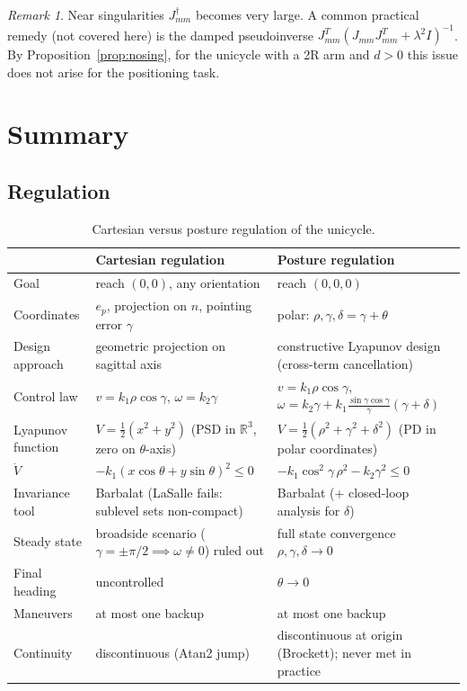 \documentclass[11pt,a4paper]{article}
\def\bm#1{#1}%
\newcommand{\R}{\mathbb{R}}
\newcommand{\Jmm}{\bm{J}_{mm}}
\theoremstyle{definition}
\theoremstyle{plain}
\theoremstyle{remark}
\newtheorem*{remark}{Remark}
\begin{document}
\begin{remark}
Near singularities $\Jmm^\dagger$ becomes very large. A common practical remedy (not covered here) is the damped pseudoinverse $\Jmm^T(\Jmm\Jmm^T+\lambda^2\bm I)^{-1}$. By Proposition~\ref{prop:nosing}, for the unicycle with a 2R arm and $d>0$ this issue does not arise for the positioning task.
\end{remark}

\section{Summary}

\subsection*{Regulation}

\begin{table}[ht]
\centering
\renewcommand{\arraystretch}{1.35}
\begin{tabular}{@{}>{\raggedright\arraybackslash}p{2.6cm}>{\raggedright\arraybackslash}p{6.0cm}>{\raggedright\arraybackslash}p{6.2cm}@{}}
\toprule
 & \textbf{Cartesian regulation} & \textbf{Posture regulation}\\
\midrule
Goal & reach $(0,0)$, any orientation & reach $(0,0,0)$\\
Coordinates & $\bm e_p$, projection on $\bm n$, pointing error $\gamma$ & polar: $\rho,\gamma,\delta=\gamma+\theta$\\
Design approach & geometric projection on sagittal axis & constructive Lyapunov design (cross-term cancellation)\\
Control law & $v=k_1\rho\cos\gamma$, $\omega=k_2\gamma$ & $v=k_1\rho\cos\gamma$, $\omega=k_2\gamma+k_1\frac{\sin\gamma\cos\gamma}{\gamma}(\gamma+\delta)$\\
Lyapunov function & $V=\frac12(x^2+y^2)$ (PSD in $\R^3$, zero on $\theta$-axis) & $V=\frac12(\rho^2+\gamma^2+\delta^2)$ (PD in polar coordinates)\\
$\dot V$ & $-k_1(x\cos\theta+y\sin\theta)^2\le0$ & $-k_1\cos^2\!\gamma\,\rho^2-k_2\gamma^2\le0$\\
Invariance tool & Barbalat (LaSalle fails: sublevel sets non-compact) & Barbalat (+ closed-loop analysis for $\delta$)\\
Steady state & broadside scenario ($\gamma=\pm\pi/2\implies\omega\ne0$) ruled out & full state convergence $\rho,\gamma,\delta\to0$\\
Final heading & uncontrolled & $\theta\to0$\\
Maneuvers & at most one backup & at most one backup\\
Continuity & discontinuous (Atan2 jump) & discontinuous at origin (Brockett); never met in practice\\
\bottomrule
\end{tabular}
\caption{Cartesian versus posture regulation of the unicycle.}
\end{table}
\end{document}
